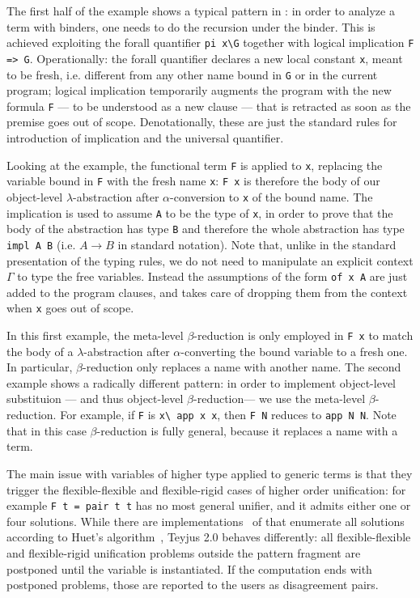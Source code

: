 \documentclass{llncs}
\begin{document}
The first half of the example shows a typical pattern in \lp: in order to analyze a term with binders, one needs to do the recursion under the binder. This is achieved exploiting the forall quantifier \verb+pi x\G+ together with logical
implication \verb+F => G+. Operationally: the forall quantifier declares a new local constant \verb+x+, meant to be fresh, i.e. different from any other name bound in \verb+G+ or in the current program; logical implication temporarily augments the program with the new formula \verb+F+ --- to be understood as a new clause --- that is retracted as soon as the premise goes out of scope. Denotationally, these are just the standard rules for introduction of implication and the universal quantifier.

Looking at the example, the functional term \verb+F+ is applied to \verb+x+, replacing the variable bound in \verb+F+ with the fresh name \verb+x+: \verb+F x+ is therefore the body of our object-level $\lambda$-abstraction after $\alpha$-conversion to \verb+x+ of the bound name. The implication is used to assume \verb+A+ to be the type of \verb+x+, in order to prove that the body of the abstraction has type \verb+B+ and therefore the whole abstraction has type \verb+impl A B+ (i.e. $A \to B$ in standard notation). Note that, unlike in the standard presentation of the typing rules, we do not need to manipulate an explicit context $\Gamma$ to type the free variables. Instead the assumptions of the form \verb+of x A+ are just added to the program clauses, and \lp{} takes care of dropping them from the context when \verb+x+ goes out of scope.

In this first example, the meta-level $\beta$-reduction is only employed in \verb+F x+ to match the body of a $\lambda$-abstraction after $\alpha$-converting the bound variable to a fresh one. In particular, $\beta$-reduction only replaces a name with another name.
The second example shows a radically different pattern: in order to implement object-level substituion --- and thus object-level $\beta$-reduction--- we use the meta-level $\beta$-reduction. For example, if
\verb+F+ is \verb+x\ app x x+, then \verb+F N+ reduces to \verb+app N N+.
Note that in this case $\beta$-reduction is fully general, because it replaces
a name with a term.

The main issue with variables of higher type applied to generic terms is
that they trigger the flexible-flexible and flexible-rigid cases of
higher order unification: for example \verb+F t = pair t t+ has no most general
unifier, and it admits either one or four solutions. While there are implementations~\cite{isabelle?} of \lp{} that enumerate all solutions according to Huet's algorithm~\cite{???}, Teyjus 2.0 behaves differently: all flexible-flexible and flexible-rigid unification problems outside the pattern fragment are postponed until the variable is instantiated. If the computation ends with postponed problems, those are reported to the users as disagreement pairs.
\end{document}

